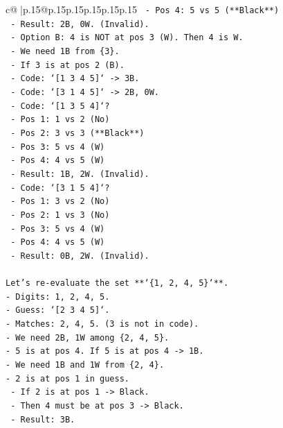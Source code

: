 \documentclass{article}
\begin{document}
{\begin{supertabular}{c@{$\;$}|p{.15\linewidth}@{}p{.15\linewidth}p{.15\linewidth}p{.15\linewidth}p{.15\linewidth}p{.15\linewidth}}
{{{\texttt{      {-} Pos 4: 5 vs 5 (**Black**)} \\
\texttt{      {-} Result: 2B, 0W. (Invalid).} \\
\texttt{  {-} Option B: 4 is NOT at pos 3 (W). Then 4 is W.} \\
\texttt{    {-} We need 1B from \{3\}.} \\
\texttt{    {-} If 3 is at pos 2 (B).} \\
\texttt{    {-} Code: `{[}1 3 4 5{]}` {-}> 3B.} \\
\texttt{    {-} Code: `{[}3 1 4 5{]}` {-}> 2B, 0W.} \\
\texttt{    {-} Code: `{[}1 3 5 4{]}`?} \\
\texttt{      {-} Pos 1: 1 vs 2 (No)} \\
\texttt{      {-} Pos 2: 3 vs 3 (**Black**)} \\
\texttt{      {-} Pos 3: 5 vs 4 (W)} \\
\texttt{      {-} Pos 4: 4 vs 5 (W)} \\
\texttt{      {-} Result: 1B, 2W. (Invalid).} \\
\texttt{    {-} Code: `{[}3 1 5 4{]}`?} \\
\texttt{      {-} Pos 1: 3 vs 2 (No)} \\
\texttt{      {-} Pos 2: 1 vs 3 (No)} \\
\texttt{      {-} Pos 3: 5 vs 4 (W)} \\
\texttt{      {-} Pos 4: 4 vs 5 (W)} \\
\texttt{      {-} Result: 0B, 2W. (Invalid).} \\
\\ 
\texttt{Let's re{-}evaluate the set **`\{1, 2, 4, 5\}`**.} \\
\texttt{{-} Digits: 1, 2, 4, 5.} \\
\texttt{{-} Guess: `{[}2 3 4 5{]}`.} \\
\texttt{{-} Matches: 2, 4, 5. (3 is not in code).} \\
\texttt{{-} We need 2B, 1W among \{2, 4, 5\}.} \\
\texttt{{-} 5 is at pos 4. If 5 is at pos 4 {-}> 1B.} \\
\texttt{{-} We need 1B and 1W from \{2, 4\}.} \\
\texttt{{-} 2 is at pos 1 in guess.} \\
\texttt{  {-} If 2 is at pos 1 {-}> Black.} \\
\texttt{  {-} Then 4 must be at pos 3 {-}> Black.} \\
\texttt{  {-} Result: 3B.} \\
}}}
\end{supertabular}}
\end{document}

